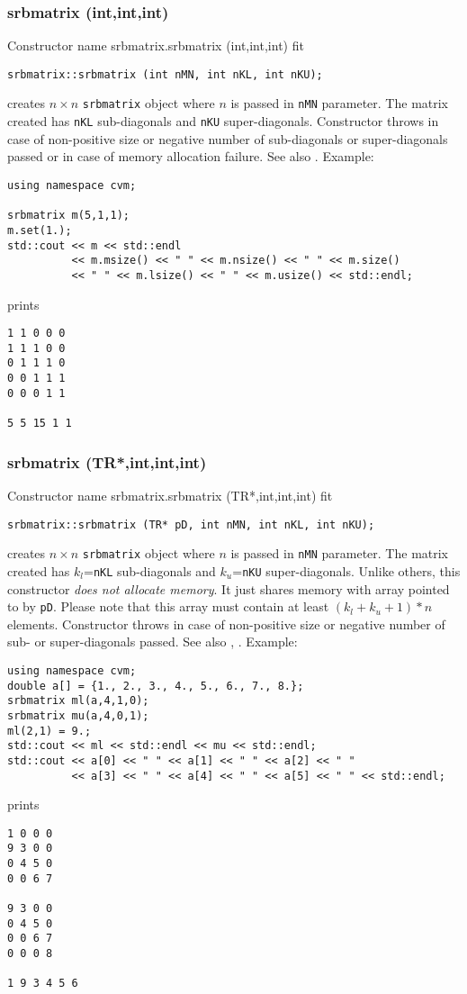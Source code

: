\subsubsection{srbmatrix (int,int,int)}
Constructor%
\pdfdest name {srbmatrix.srbmatrix (int,int,int)} fit
\begin{verbatim}
srbmatrix::srbmatrix (int nMN, int nKL, int nKU);
\end{verbatim}
creates $n\times n$ \verb"srbmatrix" object where $n$ is passed in
\verb"nMN" parameter. The matrix created has \verb"nKL" 
sub-diagonals and \verb"nKU" super-diagonals.
Constructor throws  
in case of non-positive size or negative number 
of sub-diagonals or super-diagonals
passed or in case of memory allocation failure.
See also .
Example:
\begin{Verbatim}
using namespace cvm;

srbmatrix m(5,1,1);
m.set(1.);
std::cout << m << std::endl
          << m.msize() << " " << m.nsize() << " " << m.size()
          << " " << m.lsize() << " " << m.usize() << std::endl;
\end{Verbatim}
prints
\begin{Verbatim}
1 1 0 0 0
1 1 1 0 0
0 1 1 1 0
0 0 1 1 1
0 0 0 1 1

5 5 15 1 1
\end{Verbatim}
\newpage




\subsubsection{srbmatrix (TR*,int,int,int)}
Constructor%
\pdfdest name {srbmatrix.srbmatrix (TR*,int,int,int)} fit
\begin{verbatim}
srbmatrix::srbmatrix (TR* pD, int nMN, int nKL, int nKU);
\end{verbatim}
creates  $n\times n$ \verb"srbmatrix" object where $n$ is passed in
\verb"nMN" parameter. The matrix created has $k_l$=\verb"nKL" 
sub-diagonals and $k_u$=\verb"nKU" super-diagonals.
Unlike others, this constructor \textit{does not allocate  memory}.
It just shares  memory with  array pointed to by \verb"pD".
Please note that this array must contain at least $(k_l + k_u + 1)*n$ elements.
Constructor throws  
in case of non-positive size or negative number of sub- or super-diagonals 
passed.
See also ,
.
Example:
\begin{Verbatim}
using namespace cvm;
double a[] = {1., 2., 3., 4., 5., 6., 7., 8.};
srbmatrix ml(a,4,1,0);
srbmatrix mu(a,4,0,1);
ml(2,1) = 9.;
std::cout << ml << std::endl << mu << std::endl;
std::cout << a[0] << " " << a[1] << " " << a[2] << " "
          << a[3] << " " << a[4] << " " << a[5] << " " << std::endl;
\end{Verbatim}
prints
\begin{Verbatim}
1 0 0 0
9 3 0 0
0 4 5 0
0 0 6 7

9 3 0 0
0 4 5 0
0 0 6 7
0 0 0 8

1 9 3 4 5 6
\end{Verbatim}
\newpage


